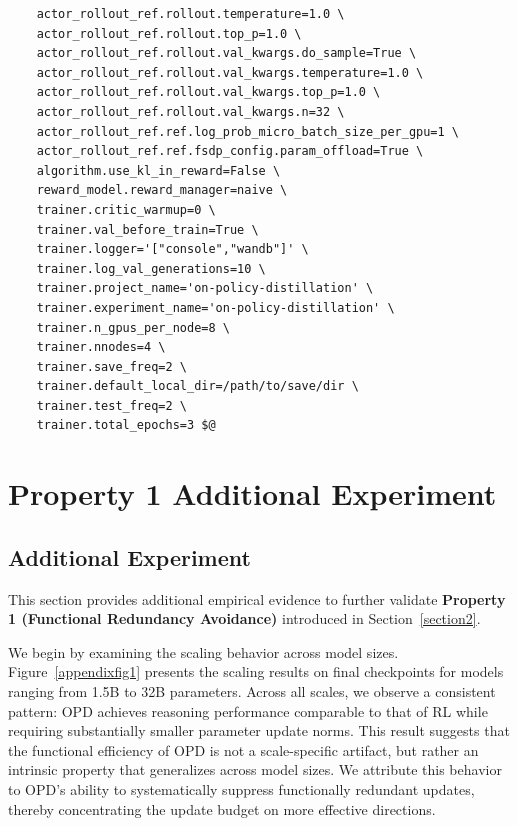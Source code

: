 \documentclass{llmxive}
\begin{document}
\begin{tcolorbox}
\begin{verbatim}
    actor_rollout_ref.rollout.temperature=1.0 \
    actor_rollout_ref.rollout.top_p=1.0 \
    actor_rollout_ref.rollout.val_kwargs.do_sample=True \
    actor_rollout_ref.rollout.val_kwargs.temperature=1.0 \
    actor_rollout_ref.rollout.val_kwargs.top_p=1.0 \
    actor_rollout_ref.rollout.val_kwargs.n=32 \
    actor_rollout_ref.ref.log_prob_micro_batch_size_per_gpu=1 \
    actor_rollout_ref.ref.fsdp_config.param_offload=True \
    algorithm.use_kl_in_reward=False \
    reward_model.reward_manager=naive \
    trainer.critic_warmup=0 \
    trainer.val_before_train=True \
    trainer.logger='["console","wandb"]' \
    trainer.log_val_generations=10 \
    trainer.project_name='on-policy-distillation' \
    trainer.experiment_name='on-policy-distillation' \
    trainer.n_gpus_per_node=8 \
    trainer.nnodes=4 \
    trainer.save_freq=2 \
    trainer.default_local_dir=/path/to/save/dir \
    trainer.test_freq=2 \
    trainer.total_epochs=3 $@
\end{verbatim}
\end{tcolorbox}

    






\section{Property 1 Additional Experiment}
\label{Property 1 Additional Experiment}

\subsection{Additional Experiment}
\label{Additional Experiment}
This section provides additional empirical evidence to further validate \textbf{Property 1 (Functional Redundancy Avoidance)} introduced in Section~\ref{section2}. 

We begin by examining the scaling behavior across model sizes. Figure~\ref{appendixfig1} presents the scaling results on final checkpoints for models ranging from 1.5B to 32B parameters. Across all scales, we observe a consistent pattern: OPD achieves reasoning performance comparable to that of RL while requiring substantially smaller parameter update norms. This result suggests that the functional efficiency of OPD is not a scale-specific artifact, but rather an intrinsic property that generalizes across model sizes. We attribute this behavior to OPD's ability to systematically suppress functionally redundant updates, thereby concentrating the update budget on more effective directions.
\end{document}

